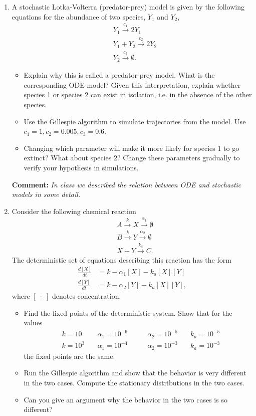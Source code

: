 \documentclass[12pt]{article}
\newcommand{\stc}{\stackrel}
\begin{document}
\begin{enumerate}
\item  A stochastic Lotka-Volterra (predator-prey) model is given by the following equations for the abundance of
two species, $Y_1$ and $Y_2$,
\begin{align*}
&Y_1 \stc{c_1}{\longrightarrow} 2 Y_1 \\
&Y_1 + Y_2 \stc{c_2}{\longrightarrow} 2 Y_2  \\
& Y_2 \stc{c_3}{\longrightarrow} \emptyset.
\end{align*}
\begin{itemize}
\item Explain why this is called a predator-prey model.  What is the corresponding ODE model? 
Given this interpretation, explain whether species 1 or species 2 can exist in isolation, i.e. in the 
absence of the other species.
\item Use the Gillespie algorithm to simulate trajectories from the model. Use
$c_1 = 1, c_2 = 0.005, c_3 = 0.6$.
\item Changing which parameter will make it more likely for species 1 to go extinct?  What about species 2?
Change these parameters gradually to verify your hypothesis in simulations.
\end{itemize}

{\bf Comment:} \emph{In class we described the relation between ODE and stochastic models
in some detail.}

\item Consider the following chemical reaction
\begin{align*}
&A \stc{k}{\longrightarrow} X \stc{\alpha_1}{\longrightarrow} \emptyset\\
&B \stc{k}{\longrightarrow} Y \stc{\alpha_2}{\longrightarrow}  \emptyset \\
& X + Y \stc{k_a}{\longrightarrow} C.
\end{align*}
The deterministic set of equations describing this reaction has the form
\begin{align*}
\frac{d [X]}{dt} &= k - \alpha_1 [X] - k_a [X] [Y] \\
\frac{d [Y]}{dt} &= k - \alpha_2 [Y] - k_a[X] [Y] ,
\end{align*}
where $[\;\cdot\;]$ denotes concentration.
\begin{itemize}
\item Find the fixed points of the deterministic system.  Show that for 
the values
\begin{align*}
& k = 10 \quad & \alpha_1 = 10^{-6} \qquad & \alpha_2 = 10^{-5} \quad & k_a = 10^{-5}  \\
& k = 10^3 \quad & \alpha_1 = 10^{-4} \qquad & \alpha_2 = 10^{-3} \quad & k_a = 10^{-3}
\end{align*}
the fixed points are the same.
\item Run the Gillespie algorithm and show that the behavior is very different in the two cases.
Compute the stationary distributions in the two cases.
\item Can you give an argument why the behavior in the two cases is so different?
\end{itemize}


\end{enumerate}
\end{document}
